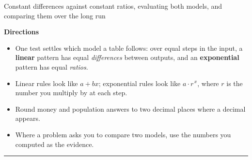 \documentclass[12pt]{article}
\begin{document}

\begin{center}
\small Constant differences against constant ratios, evaluating both models, and comparing them over the long run
\end{center}
\vspace{0.15cm}

\noindent\textbf{Directions}
\begin{itemize}[leftmargin=0.8cm, itemsep=1pt, topsep=2pt]
  \item One test settles which model a table follows: over equal steps in the input, a \textbf{linear} pattern has equal \emph{differences} between outputs, and an \textbf{exponential} pattern has equal \emph{ratios}.
  \item Linear rules look like $a + bx$; exponential rules look like $a \cdot r^{\,x}$, where $r$ is the number you multiply by at each step.
  \item Round money and population answers to two decimal places where a decimal appears.
  \item Where a problem asks you to compare two models, use the numbers you computed as the evidence.
\end{itemize}

\vspace{0.2cm}
\noindent\rule{\linewidth}{0.4pt}

\end{document}
